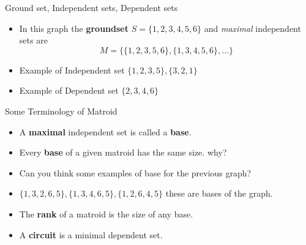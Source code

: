 \documentclass{beamer}
\begin{document}
{
\usebackgroundtemplate{}
\begin{frame}{Ground set, Independent sets, Dependent sets}
    
    \begin{itemize}
       \item <1- >In this graph the \textbf{groundset} $S =\{1,2,3,4,5,6\}$ and \textit{maximal} independent sets are
       \[
            M = \{\{1, 2, 3, 5, 6\}, \{1, 3, 4, 5, 6\}, ...\}
       \]
        \item <2- > Example of Independent set $\{1,2,3,5\} , \{3,2,1\}$
        \item <3- > Example of Dependent set $\{2,3,4,6\}$
        
    \end{itemize}

\end{frame}

\begin{frame}{Some Terminology of Matroid}
    \begin{itemize}
        \item <1- > A \textbf{maximal} independent set is called a \textbf{base}.
        \item <2- > Every \textbf{base} of a given matroid has the same size.
        why?
        \item <3- > Can you think some examples of base for the previous graph?
        \item <4 -> $\{1,3,2,6,5\} , \{1,3,4,6,5\} , \{1,2,6,4,5\}$ these are bases of the graph.
        \item <5- > The \textbf{rank} of a matroid is the size of any base.
        \item <6- > A \textbf{circuit} is a minimal dependent set.
    \end{itemize}
\end{frame}
}

\end{document}
